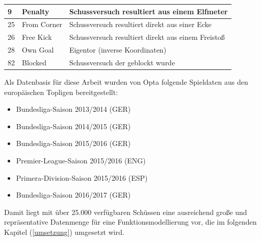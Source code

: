 \tablelasttail{}
\begin{center}%
\begin{supertabular}{ | P{2cm} | P{3cm} | P{5cm} |}
\vspace*{1mm}9 	& \vspace*{1mm}Penalty  	& 	Schussversuch resultiert aus einem Elfmeter\\
\hline
\vspace*{1mm}25	& \vspace*{1mm}From Corner  	& Schussversuch resultiert direkt aus einer Ecke 	\\
\hline
\vspace*{1mm}26	& \vspace*{1mm}Free Kick  	& Schussversuch resultiert direkt aus einem Freistoß  	\\
\hline
\vspace*{1mm}28	& \vspace*{1mm}Own Goal  	& Eigentor (inverse Koordinaten) 	\\
\hline
\vspace*{1mm}82	& \vspace*{1mm}Blocked  	& Schussversuch der geblockt wurde 	\\
\hline	
\end{supertabular}
\end{center}

Als Datenbasis für diese Arbeit wurden von Opta folgende Spieldaten aus den europäischen Topligen bereitgestellt:

\begin{itemize}
\item Bundesliga-Saison 2013/2014 (GER)
\item Bundesliga-Saison 2014/2015 (GER)
\item Bundesliga-Saison 2015/2016 (GER)
\item Premier-League-Saison 2015/2016 (ENG)
\item Primera-Division-Saison 2015/2016 (ESP)
\item Bundesliga-Saison 2016/2017 (GER)
\end{itemize}

Damit liegt mit über 25.000 verfügbaren Schüssen eine ausreichend große und repräsentative Datenmenge für eine Funktionsmodellierung vor, die im folgenden Kapitel (\vref{umsetzung}) umgesetzt wird.

